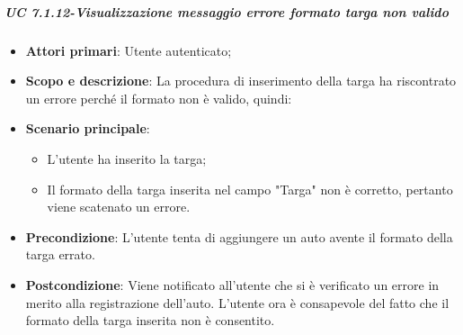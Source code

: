                  
                \subparagraph{UC 7.1.12-Visualizzazione messaggio errore formato targa non valido} 
    \begin{itemize}
                \item \textbf{Attori primari}: Utente autenticato;
               
                 \item \textbf{Scopo e descrizione}: La procedura di inserimento della targa ha riscontrato un errore perché il formato non è valido, quindi:
                
              
                 \item \textbf{Scenario principale}: 
                 \begin{itemize}
                     \item L'utente ha inserito la targa;
                     \item Il formato della targa inserita nel campo "Targa" non è corretto, pertanto viene scatenato un errore.
                 \end{itemize}
                 \item \textbf{Precondizione}:  L'utente tenta di aggiungere un auto avente il formato della targa errato.
                 \item \textbf{Postcondizione}: Viene notificato all'utente che si è verificato un errore in merito alla registrazione dell'auto. L'utente ora è consapevole del fatto che il formato della targa inserita non è consentito.
                 \end{itemize}
                 
